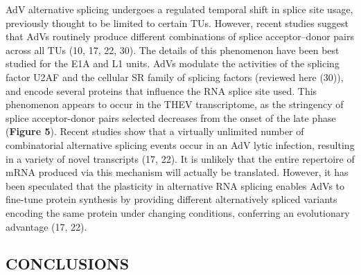 \documentclass[
]{article}
\begin{document}
AdV alternative splicing undergoes a regulated temporal shift in splice
site usage, previously thought to be limited to certain TUs. However,
recent studies suggest that AdVs routinely produce different
combinations of splice acceptor--donor pairs across all TUs (10, 17, 22,
30). The details of this phenomenon have been best studied for the E1A
and L1 units. AdVs modulate the activities of the splicing factor U2AF
and the cellular SR family of splicing factors (reviewed here (30)), and
encode several proteins that influence the RNA splice site used. This
phenomenon appears to occur in the THEV transcriptome, as the stringency
of splice acceptor-donor pairs selected decreases from the onset of the
late phase (\textbf{Figure 5}). Recent studies show that a virtually
unlimited number of combinatorial alternative splicing events occur in
an AdV lytic infection, resulting in a variety of novel transcripts (17,
22). It is unlikely that the entire repertoire of mRNA produced via this
mechanism will actually be translated. However, it has been speculated
that the plasticity in alternative RNA splicing enables AdVs to
fine-tune protein synthesis by providing different alternatively spliced
variants encoding the same protein under changing conditions, conferring
an evolutionary advantage (17, 22).

\subsection{CONCLUSIONS}\label{conclusions}
\end{document}
